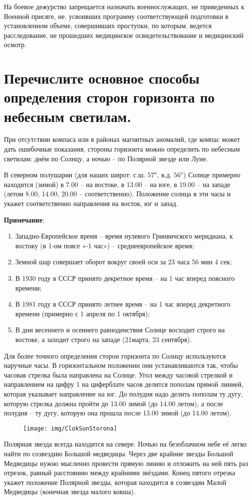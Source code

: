 \documentclass[12pt,a4paper]{report}
\begin{document}
На боевое дежурство запрещается назначать военнослужащих, не приведенных к Военной присяге, не. усвоивших программу соответствующей подготовки в установленном объеме, совершивших проступки, по которым. ведется расследование, не прошедших медицинское освидетельствование и медицинский осмотр.
\section{Перечислите основное способы определения сторон горизонта по небесным светилам.}

При отсутствии компаса или в районах магнитных аномалий, где компас может дать ошибочные показания, стороны горизонта можно определить по небесным светилам: днём по Солнцу, а ночью – по Полярной звезде или Луне.

В северном полушарии (для наших широт: с.ш. $57^{o}$, в.д. $56^{o}$) Солнце примерно находится (зимой) в 7.00 – на востоке, в 13.00 – на юге, в 19.00 – на западе (летом 8.00, 14.00, 20.00 – соответственно). Положение солнца в эти часы и укажет соответственно направления на восток, юг и запад.

\textbf{Примечание}:
\begin{enumerate}
	\item Западно-Европейское время – время нулевого Гринвичского меридиана, к востоку (в 1-ом поясе «-1 час») – среднеевропейское время;
	\item Земной шар совершает оборот вокруг своей оси за 23 часа 56 мин 4 сек;
	\item В 1930 году в СССР принято декретное время – на 1 час вперед поясного времени;
	\item В 1981 году в СССР принято летнее время – на 1 час вперед декретного времени (примерно с 1 апреля по 1 октября);
	\item В дни весеннего и осеннего равноденствия Солнце восходит строго на востоке, а заходит строго на западе (21марта, 23 сентября).
\end{enumerate}
Для более точного определения сторон горизонта по Солнцу используются наручные часы. В горизонтальном положении они устанавливаются так, чтобы часовая стрелка была направлена на Солнце. Угол между часовой стрелкой и направлением на цифру 1 на циферблате часов делится пополам прямой линией, которая указывает направление на юг. До полудня надо делить пополам ту дугу, которую стрелка должна пройти до 13.00 зимой (до 14.00 летом), а после полудня – ту дугу, которую она прошла после 13.00 зимой (до 14.00 летом).
\begin{figure}[h]
\centering
\texttt{[image: img/ClokSunStorona]}
\caption[Определение старон света часами]{}
\label{fig:ClokSunStorona}
\end{figure}
Полярная звезда всегда находится на севере. Ночью на безоблачном небе её легко найти по созвездию Большой медведицы. Через две крайние звезды Большой Медведицы нужно мысленно провести прямую линию и отложить на ней пять раз отрезок, равный расстоянию между крайними звёздами. Конец пятого отрезка укажет положение Полярной звезды, которая находится в созвездии Малой Медведицы (конечная звезда малого ковша).
\end{document}
